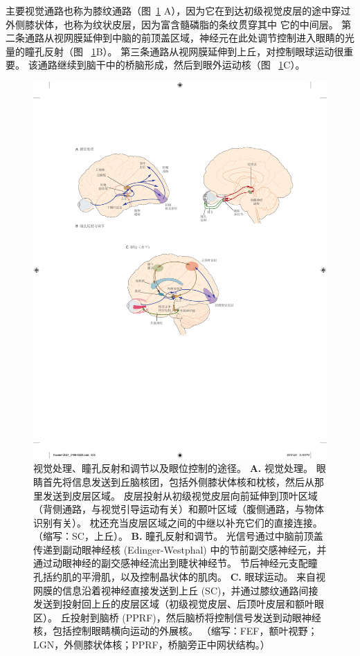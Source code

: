 主要视觉通路也称为膝纹通路（图~\ref{fig:21_6} A），因为它在到达初级视觉皮层的途中穿过外侧膝状体，也称为纹状皮层，因为富含髓磷脂的条纹贯穿其中 它的中间层。
第二条通路从视网膜延伸到中脑的前顶盖区域，神经元在此处调节控制进入眼睛的光量的瞳孔反射（图 ~\ref{fig:21_6}B）。
第三条通路从视网膜延伸到上丘，对控制眼球运动很重要。
该通路继续到脑干中的桥脑形成，然后到眼外运动核（图 ~\ref{fig:21_6}C）。


\begin{figure}[htbp]
	\centering
	\includegraphics[width=1.0\linewidth]{chap21/fig_21_6}
	\caption{视觉处理、瞳孔反射和调节以及眼位控制的途径。
		\textbf{A.} 视觉处理。
		眼睛首先将信息发送到丘脑核团，包括外侧膝状体核和枕核，然后从那里发送到皮层区域。
		皮层投射从初级视觉皮层向前延伸到顶叶区域（背侧通路，与视觉引导运动有关）和颞叶区域（腹侧通路，与物体识别有关）。
		枕还充当皮层区域之间的中继以补充它们的直接连接。（缩写：SC，上丘）。
		\textbf{B.} 瞳孔反射和调节。
		光信号通过中脑前顶盖传递到副动眼神经核 (Edinger-Westphal) 中的节前副交感神经元，并通过动眼神经的副交感神经流出到睫状神经节。
		节后神经元支配瞳孔括约肌的平滑肌，以及控制晶状体的肌肉。
		\textbf{C.} 眼球运动。
		来自视网膜的信息沿着视神经直接发送到上丘 (SC)，并通过膝纹通路间接发送到投射回上丘的皮层区域（初级视觉皮层、后顶叶皮层和额叶眼区）。
		丘投射到脑桥 (PPRF)，然后脑桥将控制信号发送到动眼神经核，包括控制眼睛横向运动的外展核。 （缩写：FEF，额叶视野；LGN，外侧膝状体核；PPRF，桥脑旁正中网状结构。）}
	\label{fig:21_6}
\end{figure}


